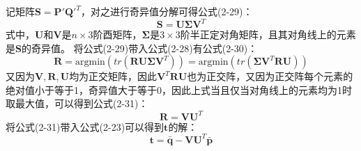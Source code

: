     记矩阵$\mathbf{S}=\mathbf{P}' \mathbf{Q}'^{T}$，对之进行奇异值分解可得公式(2-29)：
    \begin{equation}
        \mathbf{S} = \mathbf{U} \mathbf{\Sigma} \mathbf{V}^T
    \end{equation}
    式中，$\mathbf{U}$和$\mathbf{V}$是$n\times3$阶酉矩阵，$\mathbf{\Sigma}$是$3\times 3$阶半正定对角矩阵，且其对角线上的元素是$\mathbf{S}$的奇异值。
    将公式(2-29)带入公式(2-28)有公式(2-30)：
    \begin{equation}
        \mathbf{R}
        = 
        \mathrm{argmin}(tr(\mathbf{R} \mathbf{U} \mathbf{\Sigma} \mathbf{V}^T))
        =
        \mathrm{argmin}(tr(\mathbf{\Sigma} \mathbf{V}^T \mathbf{R} \mathbf{U}))
    \end{equation}
    又因为$\mathbf{V},\mathbf{R},\mathbf{U}$均为正交矩阵，因此$\mathbf{V}^T \mathbf{R} \mathbf{U}$也为正交阵，又因为正交阵每个元素的绝对值小于等于1，奇异值大于等于0，因此上式当且仅当对角线上的元素均为1时取最大值，可以得到公式(2-31)：
    \begin{equation}
        \mathbf{R} = \mathbf{V} \mathbf{U}^T
    \end{equation}
    将公式(2-31)带入公式(2-23)可以得到$\mathbf{t}$的解：
    \begin{equation}
        \mathbf{t} = \mathbf{\bar{q}} - \mathbf{V} \mathbf{U}^T \mathbf{\bar{p}}
    \end{equation}

